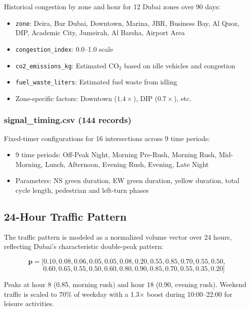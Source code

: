 \documentclass[12pt, a4paper]{article}
\begin{document}
Historical congestion by zone and hour for 12 Dubai zones over 90 days:
\begin{itemize}[nosep]
    \item \texttt{zone}: Deira, Bur Dubai, Downtown, Marina, JBR, Business Bay, Al Quoz, DIP, Academic City, Jumeirah, Al Barsha, Airport Area
    \item \texttt{congestion\_index}: 0.0--1.0 scale
    \item \texttt{co2\_emissions\_kg}: Estimated CO$_2$ based on idle vehicles and congestion
    \item \texttt{fuel\_waste\_liters}: Estimated fuel waste from idling
    \item Zone-specific factors: Downtown ($1.4\times$), DIP ($0.7\times$), etc.
\end{itemize}

\subsubsection{signal\_timing.csv (144 records)}

Fixed-timer configurations for 16 intersections across 9 time periods:
\begin{itemize}[nosep]
    \item 9 time periods: Off-Peak Night, Morning Pre-Rush, Morning Rush, Mid-Morning, Lunch, Afternoon, Evening Rush, Evening, Late Night
    \item Parameters: NS green duration, EW green duration, yellow duration, total cycle length, pedestrian and left-turn phases
\end{itemize}

\subsection{24-Hour Traffic Pattern}

The traffic pattern is modeled as a normalized volume vector over 24 hours, reflecting Dubai's characteristic double-peak pattern:

\begin{equation}
    \mathbf{p} = [0.10, 0.08, 0.06, 0.05, 0.05, 0.08, 0.20, 0.55, 0.85, 0.70, 0.55, 0.50,
\end{equation}
\begin{equation*}
    \qquad 0.60, 0.65, 0.55, 0.50, 0.60, 0.80, 0.90, 0.85, 0.70, 0.55, 0.35, 0.20]
\end{equation*}

Peaks at hour 8 (0.85, morning rush) and hour 18 (0.90, evening rush). Weekend traffic is scaled to 70\% of weekday with a 1.3$\times$ boost during 10:00--22:00 for leisure activities.
\end{document}
